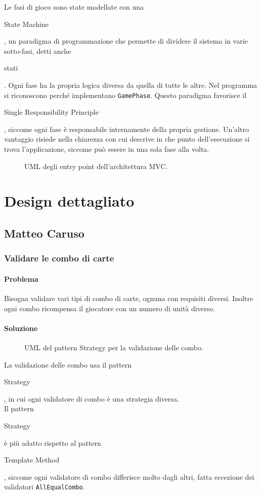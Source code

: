 \documentclass[a4paper,12pt]{report}
\begin{document}
Le fasi di gioco sono state modellate con una \begin{itshape}State Machine\end{itshape}, un paradigma di programmazione che permette di dividere il sistema in varie sotto-fasi, detti anche \begin{itshape}stati\end{itshape}. Ogni fase ha la propria logica diversa da quella di tutte le altre. Nel programma si riconoscono perché implementano \texttt{GamePhase}.
Questo paradigma favorisce il \begin{itshape}Single Responsibility Principle\end{itshape}, siccome ogni fase è responsabile internamente della propria gestione.
Un'altro vantaggio risiede nella chiarezza con cui descrive in che punto dell'esecuzione si trova l'applicazione, siccome può essere in una sola fase alla volta.
\pagebreak
\begin{figure}[H]
	\centering
	
	\caption{UML degli entry point dell'architettura MVC.}
\end{figure}
\pagebreak

\section{Design dettagliato}
\subsection{Matteo Caruso}
\subsubsection{Validare le combo di carte}
\paragraph{Problema}
Bisogna validare vari tipi di combo di carte, ognuna con requisiti diversi. Inoltre ogni combo ricompensa il giocatore con un numero di unità diverso.
\paragraph{Soluzione}
\begin{figure}[H]
	\centering
	
	\caption{UML del pattern Strategy per la validazione delle combo.}
\end{figure}
La validazione delle combo usa il pattern \begin{itshape}Strategy\end{itshape}, in cui ogni validatore di combo è una strategia diversa.
\\
Il pattern \begin{itshape}Strategy\end{itshape} è più adatto rispetto al pattern \begin{itshape}Template Method\end{itshape}, siccome ogni validatore di combo differisce molto dagli altri, fatta eccezione dei validatori \texttt{AllEqualCombo}.
\end{document}
